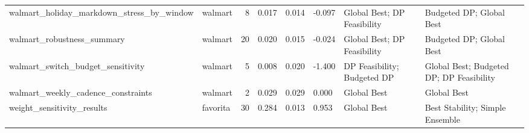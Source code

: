 \begin{table}
{\begin{tabular}{llrlllll}
   walmart\_holiday\_markdown\_stress\_by\_window &      walmart &                       8 &                                      0.017 &                                       0.014 &                 -0.097 &            Global Best; DP Feasibility &                   Budgeted DP; Global Best \\
                  walmart\_robustness\_summary &      walmart &                      20 &                                      0.020 &                                       0.015 &                 -0.024 &            Global Best; DP Feasibility &                   Budgeted DP; Global Best \\
           walmart\_switch\_budget\_sensitivity &      walmart &                       5 &                                      0.008 &                                       0.020 &                 -1.400 &            DP Feasibility; Budgeted DP &   Global Best; Budgeted DP; DP Feasibility \\
          walmart\_weekly\_cadence\_constraints &      walmart &                       2 &                                      0.029 &                                       0.029 &                  0.000 &                            Global Best &                                Global Best \\
                  weight\_sensitivity\_results &     favorita &                      30 &                                      0.284 &                                       0.013 &                  0.953 &                            Global Best &            Best Stability; Simple Ensemble \\
\bottomrule
\end{tabular}
}

\end{table}
